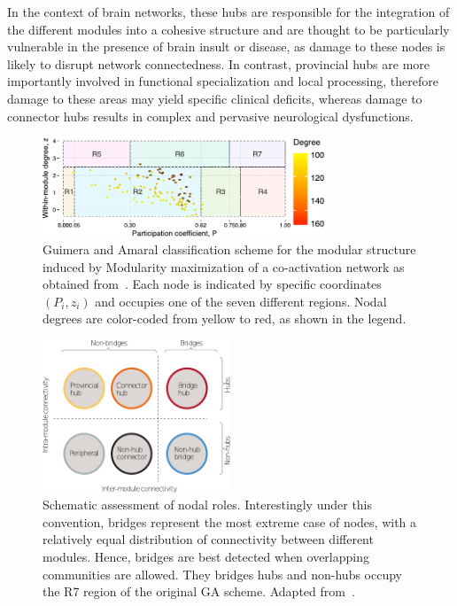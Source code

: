 \documentclass[11pt,              a4paper,              twoside,openright,              titlepage,              headinclude,footinclude,                            numbers=noenddot,              cleardoublepage=empty,]{scrreprt}
\begin{document}
In the context of brain networks, these hubs are responsible for the integration of the different modules into a cohesive structure and are thought to be particularly vulnerable in the presence of brain insult or disease, as damage to these nodes is likely to disrupt network connectedness.
In contrast, provincial hubs are more importantly involved in functional specialization and local processing, therefore damage to these areas may yield specific clinical deficits, whereas damage to connector hubs results in complex and pervasive neurological dysfunctions.

\begin{figure}[htb!]
\centering
\includegraphics[width=0.75\textwidth]{images/guimera_amaral_coact_q.pdf}
\caption{Guimera and Amaral classification scheme for the modular structure induced by Modularity maximization of a co-activation network as obtained from~\cite{crossley2013a}.
Each node is indicated by specific coordinates $(P_i,z_i)$ and occupies one of the seven different regions. Nodal degrees are color-coded from yellow to red, as shown in the legend.}
\label{fig:gagraph}
\end{figure}

\begin{figure}[htb!]
\centering
\includegraphics[width=0.5\textwidth]{images/hubs_nonhubs.pdf}
\caption{Schematic assessment of nodal roles.
Interestingly under this convention, bridges represent the most extreme case of nodes, with a relatively equal distribution of connectivity between different modules.
Hence, bridges are best detected when overlapping communities are allowed.
They bridges hubs and non-hubs occupy the R7 region of the original GA scheme.
Adapted from~\cite{fornito2015}.}
\label{fig:hubs_bridges}
\end{figure}
\end{document}
